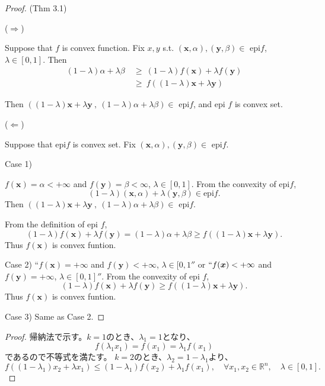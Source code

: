\documentclass[12pt]{jsarticle}
\begin{document}
\begin{proof}
(Thm 3.1)

($\Rightarrow$)

Suppose that $f$ is convex function. Fix $x,  y$ s.t. $(\bm{x}, \alpha), (\bm{y}, \beta) \in$ epi$f$,  $\lambda \in [0, 1]$. Then
\begin{align*}
(1 - \lambda) \alpha + \lambda \beta \ & \ge \ (1 - \lambda) f(\bm{x}) + \lambda f(\bm{y})\\
                                                                & \ge \ f((1 - \lambda) \bm{x} + \lambda \bm{y})
\end{align*}

Then $((1 - \lambda) \bm{x} + \lambda \bm{y}\ ,\  (1 - \lambda) \alpha + \lambda \beta) \in$ epi$f$, and epi $f$ is convex set.


($\Leftarrow$)

Suppose that epi$f$ is convex set.  Fix $(\bm{x}, \alpha), (\bm{y}, \beta) \in$ epi$f$.

Case 1)

$f(\bm{x}) = \alpha < +\infty$ and $ f(\bm{y}) = \beta < \infty$,  $\lambda \in [0, 1]$.  From the convexity of epi$f$,
\[
(1 - \lambda) (\bm{x}, \alpha) + \lambda (\bm{y}, \beta) \in \text{epi} f. 
\]
Then $((1 - \lambda) \bm{x} + \lambda \bm{y}\ ,\  (1 - \lambda) \alpha + \lambda \beta) \in$ epi$f$.

From the definition of epi $f$,
\[
(1 - \lambda)f(\bm{x}) + \lambda f(\bm{y}) = (1 - \lambda) \alpha + \lambda \beta \ge  f((1 - \lambda) \bm{x}  + \lambda \bm{y}).
\]
Thus $f(\bm{x})$ is convex funtion.

Case 2)
``$f(\bm{x}) = +\infty$ and $ f(\bm{y}) < + \infty$,  $\lambda \in [0, 1'' $ or $ ``f(\bm{x}) < +\infty$ and $ f(\bm{y}) = + \infty$,  $\lambda \in [0, 1]''$. 
From the convexity of epi $f$,
\[
(1 - \lambda)f(\bm{x}) + \lambda f(\bm{y})  \ge  f((1 - \lambda) \bm{x}  + \lambda \bm{y}).
\]
Thus $f(\bm{x})$ is convex funtion.

Case 3)
Same as Case 2.


\end{proof}


\begin{proof}

帰納法で示す。$k = 1$のとき、$\lambda_1 = 1$となり、
\[
f(\lambda_1 x_1) = f(x_1) = \lambda_1 f(x_1)
\]
であるので不等式を満たす。
$k = 2$のとき、$\lambda_2 = 1 - \lambda_1$より、
\[
f((1 - \lambda_1)x_2+ \lambda x_1) \le (1 - \lambda_1) f(x_2) + \lambda_1 f(x_1), \quad \forall x_1,  x_2\in \mathbb{R}^n, \quad \lambda \in [0, 1].
\] 


\end{proof}
\end{document}
